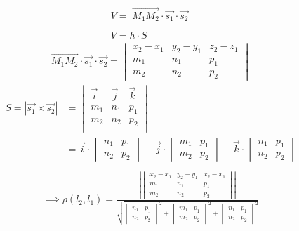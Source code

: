 \begin{gather*}
  V = |\overrightarrow{M_1M_2} \cdot \vec{s_1} \cdot \vec{s_2}| \\
  V= h \cdot S
\end{gather*}
\begin{gather*}
  \overrightarrow{M_1M_2} \cdot \vec{s_1} \cdot \vec{s_2} = 
  \begin{vmatrix}
    x_2 - x_1 & y_2 - y_1 & z_2 - z_1 \\
    m_1 & n_1 & p_1 \\
    m_2 & n_2 & p_2
  \end{vmatrix}
\end{gather*}
\begin{align*}
  S = |\vec{s_1} \times \vec{s_2}| &= 
  \begin{vmatrix}
    \vec{i} & \vec{j} & \vec{k} \\
    m_1 & n_1 & p_1 \\
    m_2 & n_2 & p_2 \\
  \end{vmatrix} \\
  &=
  \vec{i} \cdot 
  \begin{vmatrix}
    n_1 & p_1 \\
    n_2 & p_2
  \end{vmatrix} - \vec{j} \cdot 
  \begin{vmatrix}
    m_1 & p_1 \\
    m_2 & p_2
  \end{vmatrix} + \vec{k} \cdot 
  \begin{vmatrix}
    n_1 & p_1 \\
    n_2 & p_2
  \end{vmatrix} \\
\end{align*}
\begin{gather*}
  \implies \rho(l_2, l_1) = 
  \frac{
    \left|
    \begin{vmatrix}
      x_2 - x_1 & y_2 - y_1 & x_2 - x_1 \\
      m_1 & n_1 & p_1 \\
      m_2 & n_2 & p_2
    \end{vmatrix}
    \right| 
  }{
  \sqrt{
    \begin{vmatrix}
      n_1 & p_1 \\
      n_2 & p_2
    \end{vmatrix}^2 +
    \begin{vmatrix}
      m_1 & p_1 \\
      m_2 & p_2
    \end{vmatrix}^2 +  
    \begin{vmatrix}
      n_1 & p_1 \\
      n_2 & p_2
    \end{vmatrix}^2 
  } 
  }
\end{gather*}
  

